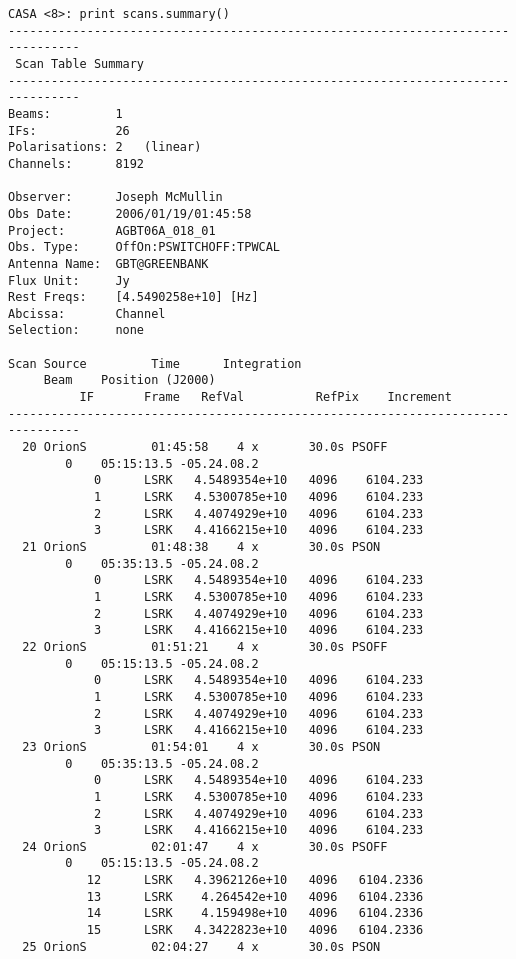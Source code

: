 \small
\begin{verbatim}
CASA <8>: print scans.summary()
--------------------------------------------------------------------------------
 Scan Table Summary
--------------------------------------------------------------------------------
Beams:         1   
IFs:           26  
Polarisations: 2   (linear)
Channels:      8192

Observer:      Joseph McMullin
Obs Date:      2006/01/19/01:45:58
Project:       AGBT06A_018_01
Obs. Type:     OffOn:PSWITCHOFF:TPWCAL
Antenna Name:  GBT@GREENBANK
Flux Unit:     Jy
Rest Freqs:    [4.5490258e+10] [Hz]
Abcissa:       Channel
Selection:     none

Scan Source         Time      Integration       
     Beam    Position (J2000)
          IF       Frame   RefVal          RefPix    Increment   
--------------------------------------------------------------------------------
  20 OrionS         01:45:58    4 x       30.0s PSOFF
        0    05:15:13.5 -05.24.08.2
            0      LSRK   4.5489354e+10   4096    6104.233
            1      LSRK   4.5300785e+10   4096    6104.233
            2      LSRK   4.4074929e+10   4096    6104.233
            3      LSRK   4.4166215e+10   4096    6104.233
  21 OrionS         01:48:38    4 x       30.0s PSON
        0    05:35:13.5 -05.24.08.2
            0      LSRK   4.5489354e+10   4096    6104.233
            1      LSRK   4.5300785e+10   4096    6104.233
            2      LSRK   4.4074929e+10   4096    6104.233
            3      LSRK   4.4166215e+10   4096    6104.233
  22 OrionS         01:51:21    4 x       30.0s PSOFF
        0    05:15:13.5 -05.24.08.2
            0      LSRK   4.5489354e+10   4096    6104.233
            1      LSRK   4.5300785e+10   4096    6104.233
            2      LSRK   4.4074929e+10   4096    6104.233
            3      LSRK   4.4166215e+10   4096    6104.233
  23 OrionS         01:54:01    4 x       30.0s PSON
        0    05:35:13.5 -05.24.08.2
            0      LSRK   4.5489354e+10   4096    6104.233
            1      LSRK   4.5300785e+10   4096    6104.233
            2      LSRK   4.4074929e+10   4096    6104.233
            3      LSRK   4.4166215e+10   4096    6104.233
  24 OrionS         02:01:47    4 x       30.0s PSOFF
        0    05:15:13.5 -05.24.08.2
           12      LSRK   4.3962126e+10   4096   6104.2336
           13      LSRK    4.264542e+10   4096   6104.2336
           14      LSRK    4.159498e+10   4096   6104.2336
           15      LSRK   4.3422823e+10   4096   6104.2336
  25 OrionS         02:04:27    4 x       30.0s PSON

\end{verbatim}
